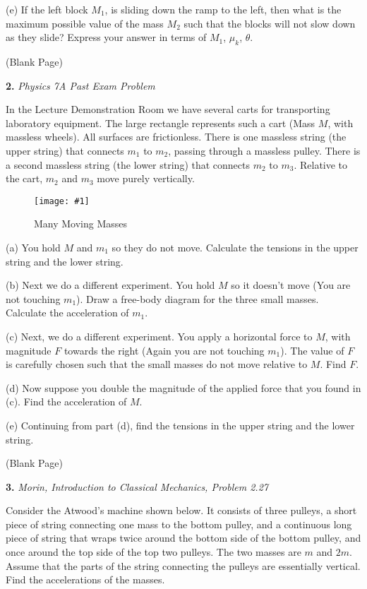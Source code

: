 \documentclass[11pt]{article}
\newcommand{\fig}[4]{
    \begin{figure}[H]
        \centering
        \texttt{[image: \#1]}
        \caption{#2}
        \label{exp4fit}
    \end{figure}
}
\theoremstyle{gangnamstyle}{\newtheorem{definition}{Definition}[]}
\theoremstyle{gangnamstyle}{\newtheorem{example}{Example}[]}
\theoremstyle{gangnamstyle}{\newtheorem{problem}{Problem}[]}
\begin{document}
(e) If the left block $M_1$, is sliding down the ramp to the left, then what is the maximum possible value of the mass $M_2$ such that the blocks will not slow down as they slide? Express your answer in terms of $M_1$, $\mu_k$, $\theta$.

\pagebreak

\begin{center}
(Blank Page)
\end{center}

\pagebreak

\textbf{2.} \textit{Physics 7A Past Exam Problem}

In the Lecture Demonstration Room we have several carts for transporting laboratory equipment. The large rectangle represents such a cart (Mass $M$, with massless wheels). All surfaces are frictionless. There is one massless string (the upper string) that connects $m_1$ to $m_2$, passing through a massless pulley. There is a second massless string (the lower string) that connects $m_2$ to $m_3$. Relative to the cart, $m_2$ and $m_3$ move purely vertically. 

\fig{figs/mt1/s203.png}{Many Moving Masses}{0.65}{0}

(a) You hold $M$ and $m_1$ so they do not move. Calculate the tensions in the upper string and the lower string. 

(b) Next we do a different experiment. You hold $M$ so it doesn't move (You are not touching $m_1$). Draw a free-body diagram for the three small masses. Calculate the acceleration of $m_1$. 

(c) Next, we do a different experiment. You apply a horizontal force to $M$, with magnitude $F$ towards the right (Again you are not touching $m_1$). The value of $F$ is carefully chosen such that the small masses do not move relative to $M$. Find $F$. 

(d) Now suppose you double the magnitude of the applied force that you found in (c). Find the acceleration of $M$. 

(e) Continuing from part (d), find the tensions in the upper string and the lower string. 

\pagebreak

\begin{center}
(Blank Page)
\end{center}

\pagebreak

\textbf{3.} \textit{Morin, Introduction to Classical Mechanics, Problem 2.27} 

Consider the Atwood’s machine shown below. It consists of three pulleys, a short piece of string connecting one mass to the bottom pulley, and a continuous long piece of string that wraps twice around the bottom side of the bottom pulley, and once around the top side of the top two pulleys. The two masses are $m$ and $2m$. Assume that the parts of the string connecting the pulleys are essentially vertical. Find the accelerations of the masses. 
\end{document}
